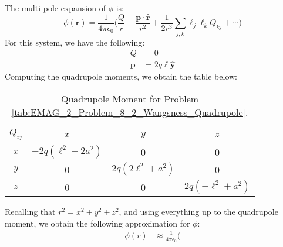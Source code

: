 \documentclass[crop=false,class=book,oneside]{standalone}
\begin{document}
            \begin{solution}
                The multi-pole expansion of $\phi$ is:
                \begin{equation}
                    \phi(\mathbf{r})=\frac{1}{4\pi\epsilon_{0}}\Big(
                    \frac{Q}{r}+\frac{\mathbf{p}\cdot\hat{\mathbf{r}}}{r^{2}}
                    +\frac{1}{2r^{3}}\sum_{j,k}\ell_{j}\ell_{k}Q_{kj}+\cdots\Big)
                \end{equation}
                For this system, we have the following:
                \begin{subequations}
                    \begin{align}
                        Q&=0\\
                        \mathbf{p}&=2q\ell\hat{\mathbf{y}}
                    \end{align}
                \end{subequations}
                Computing the quadrupole moments, we obtain the table below:
                \begin{table}[H]
                    \centering
                    \captionsetup{type=table}
                    \begin{tabular}{|c|c|c|c|}
                        \hline
                        $Q_{ij}$&$x$&$y$&$z$\\
                        \hline
                        $x$&$-2q(\ell^{2}+2a^{2})$&0&0\\
                        \hline
                        $y$&0&$2q(2\ell^{2}+a^{2})$&0\\
                        \hline
                        $z$&0&0&$2q(-\ell^{2}+a^{2})$\\
                        \hline
                    \end{tabular}
                    \caption{Quadrupole Moment for Problem
                             \ref{tab:EMAG_2_Problem_8_2_Wangsness_Quadrupole}.}
                    \label{tab:EMAG_2_Problem_8_4_Wangsness_Quadrupole}
                \end{table}
                Recalling that $r^{2}=x^{2}+y^{2}+z^{2}$, and using
                everything up to the quadrupole moment, we obtain the following
                approximation for $\phi$:
                \begin{subequations}
                    \begin{align}
                        \phi(r)&\approx
                        \frac{1}{4\pi\epsilon_{0}}\Big(

\end{align}
\end{subequations}
\end{solution}
\end{document}
